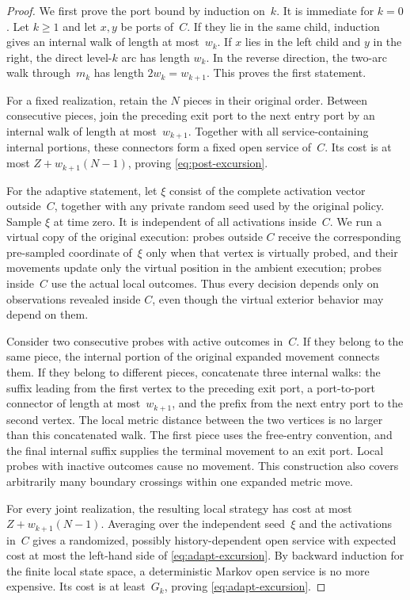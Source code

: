 \documentclass[12pt,a4paper,oneside]{report}
\begin{document}
\begin{proof}
We first prove the port bound by induction on~$k$.  It is immediate for
$k=0$.  Let $k\ge1$ and let $x,y$ be ports of~$C$.  If they lie in the same
child, induction gives an internal walk of length at most~$w_k$.  If $x$ lies
in the left child and $y$ in the right, the direct level-$k$ arc has length
$w_k$.  In the reverse direction, the two-arc walk through~$m_k$ has length
$2w_k=w_{k+1}$.  This proves the first statement.

For a fixed realization, retain the $N$ pieces in their original order.
Between consecutive pieces, join the preceding exit port to the next entry
port by an internal walk of length at most~$w_{k+1}$.  Together with all
service-containing internal portions, these connectors form a fixed open
service of~$C$.  Its cost is at most $Z+w_{k+1}(N-1)$, proving
\cref{eq:post-excursion}.

For the adaptive statement, let $\xi$ consist of the complete activation
vector outside~$C$, together with any private random seed used by the original
policy.  Sample $\xi$ at time zero.  It is independent of all activations
inside~$C$.  We run a virtual copy of the original execution: probes outside
$C$ receive the corresponding pre-sampled coordinate of~$\xi$ only when that
vertex is virtually probed, and their movements update only the virtual
position in the ambient execution; probes inside~$C$ use the actual local
  outcomes.  Thus every decision depends only on observations revealed inside
  $C$, even though the virtual exterior behavior may depend on them.

Consider two consecutive probes with active outcomes in~$C$.  If they belong to the same
piece, the internal portion of the original expanded movement connects them.
If they belong to different pieces, concatenate three internal walks: the
suffix leading from the first vertex to the preceding exit port, a
port-to-port connector of length at most~$w_{k+1}$, and the prefix from the
next entry port to the second vertex.  The local metric distance between the
two vertices is no larger than this concatenated walk.  The first piece uses
the free-entry convention, and the final internal suffix supplies the terminal
movement to an exit port.  Local probes with inactive outcomes cause no movement.  This
construction also covers arbitrarily many boundary crossings within one
expanded metric move.

For every joint realization, the resulting local strategy has cost at most
$Z+w_{k+1}(N-1)$.  Averaging over the independent seed~$\xi$ and the
activations in~$C$ gives a randomized, possibly history-dependent open service
with expected cost at most the left-hand side of
\cref{eq:adapt-excursion}.  By backward induction for the finite local state
space, a deterministic Markov open service is no more expensive.  Its cost is
at least~$G_k$, proving \cref{eq:adapt-excursion}.
\end{proof}
\end{document}
